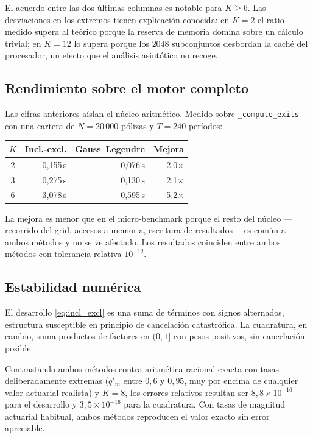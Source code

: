 \documentclass[a4paper, 12pt]{article}
\begin{document}
El acuerdo entre las dos últimas columnas es notable para $K \ge 6$. Las desviaciones en los extremos tienen explicación conocida: en $K=2$ el ratio medido supera al teórico porque la reserva de memoria domina sobre un cálculo trivial; en $K=12$ lo supera porque los $2048$ subconjuntos desbordan la caché del procesador, un efecto que el análisis asintótico no recoge.

\subsection{Rendimiento sobre el motor completo}

Las cifras anteriores aíslan el núcleo aritmético. Medido sobre \texttt{\_compute\_exits} con una cartera de $N = 20\,000$ pólizas y $T = 240$ períodos:

\begin{center}
\begin{tabular}{crrr}
\toprule
$K$ & Incl.-excl. & Gauss--Legendre & Mejora \\
\midrule
2 & 0,155\,s & 0,076\,s & 2.0$\times$ \\
3 & 0,275\,s & 0,130\,s & 2.1$\times$ \\
6 & 3,078\,s & 0,595\,s & 5.2$\times$ \\
\bottomrule
\end{tabular}
\end{center}

La mejora es menor que en el micro-benchmark porque el resto del núcleo —recorrido del grid, accesos a memoria, escritura de resultados— es común a ambos métodos y no se ve afectado. Los resultados coinciden entre ambos métodos con tolerancia relativa $10^{-12}$.

\subsection{Estabilidad numérica}

El desarrollo \eqref{eq:incl_excl} es una suma de términos con signos alternados, estructura susceptible en principio de cancelación catastrófica. La cuadratura, en cambio, suma productos de factores en $(0,1]$ con pesos positivos, sin cancelación posible.

Contrastando ambos métodos contra aritmética racional exacta con tasas deliberadamente extremas ($q'_m$ entre $0{,}6$ y $0{,}95$, muy por encima de cualquier valor actuarial realista) y $K=8$, los errores relativos resultan ser $8{,}8 \times 10^{-16}$ para el desarrollo y $3{,}5 \times 10^{-16}$ para la cuadratura. Con tasas de magnitud actuarial habitual, ambos métodos reproducen el valor exacto sin error apreciable.
\end{document}
